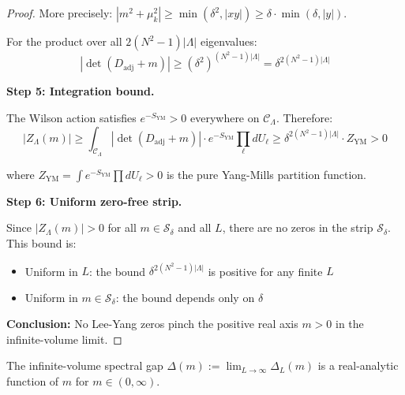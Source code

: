 \begin{proof}
More precisely: $|m^2 + \mu_k^2| \geq \min(\delta^2, |xy|) \geq \delta \cdot \min(\delta, |y|)$.

For the product over all $2(N^2-1)|\Lambda|$ eigenvalues:
\[
|\det(D_{\mathrm{adj}} + m)| \geq (\delta^2)^{(N^2-1)|\Lambda|} = \delta^{2(N^2-1)|\Lambda|}
\]

\textbf{Step 5: Integration bound.}

The Wilson action satisfies $e^{-S_{\mathrm{YM}}} > 0$ everywhere on $\mathcal{C}_\Lambda$.
Therefore:
\[
|Z_\Lambda(m)| \geq \int_{\mathcal{C}_\Lambda} |\det(D_{\mathrm{adj}} + m)| \cdot e^{-S_{\mathrm{YM}}} \prod_\ell dU_\ell 
\geq \delta^{2(N^2-1)|\Lambda|} \cdot Z_{\mathrm{YM}} > 0
\]

where $Z_{\mathrm{YM}} = \int e^{-S_{\mathrm{YM}}} \prod dU_\ell > 0$ is the pure Yang-Mills partition function.

\textbf{Step 6: Uniform zero-free strip.}

Since $|Z_\Lambda(m)| > 0$ for all $m \in \mathcal{S}_\delta$ and all $L$, there are 
no zeros in the strip $\mathcal{S}_\delta$. This bound is:
\begin{itemize}
\item Uniform in $L$: the bound $\delta^{2(N^2-1)|\Lambda|}$ is positive for any finite $L$
\item Uniform in $m \in \mathcal{S}_\delta$: the bound depends only on $\delta$
\end{itemize}

\textbf{Conclusion:} No Lee-Yang zeros pinch the positive real axis $m > 0$ in the 
infinite-volume limit.
\end{proof}

\begin{corollary}
\label{cor:delta-m-analytic}
The infinite-volume spectral gap $\Delta(m) := \lim_{L \to \infty} \Delta_L(m)$ 
is a real-analytic function of $m$ for $m \in (0, \infty)$.
\end{corollary}

